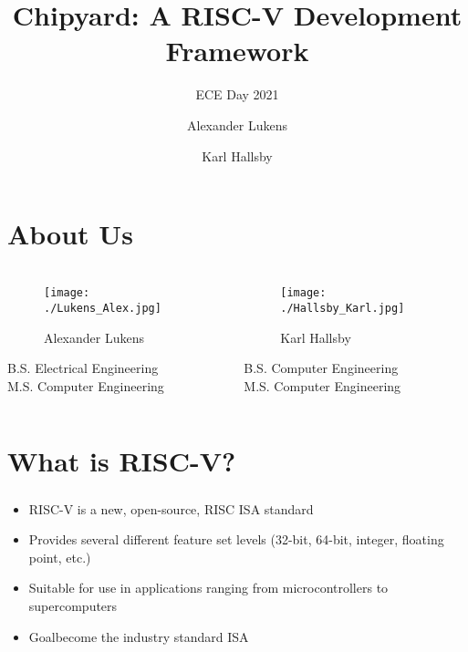 \documentclass{eceday}
\title[Chipyard]{Chipyard: A RISC-V Development Framework}
\subtitle{ECE Day 2021}
\author{Alexander Lukens \and Karl Hallsby}
\institute{Illinois Institute of Technology}
\date{\DTMdisplaydate{2021}{4}{9}{-1}}
\begin{document}
\nocite{chipyard}
\nocite{firesimChipyardOverview}

\begin{frame}
  \titlepage{}
\end{frame}

\section{About Us}\label{sec:About_Us}
\begin{frame}
  \frametitle{}
  
  \begin{columns}
    \begin{column}{0.50\linewidth}
      \begin{figure}[h!tbp]
        \centering
        \texttt{[image: ./Lukens\_Alex.jpg]}
        \caption*{Alexander Lukens}
        \label{fig:Alex_Lukens}
      \end{figure}
  		\begin{center}
          B.S. Electrical Engineering \\
          M.S. Computer Engineering
  		\end{center}
    \end{column}
    \begin{column}{0.50\linewidth}
      \begin{figure}[h!tbp]
        \centering
        \texttt{[image: ./Hallsby\_Karl.jpg]}
        \caption*{Karl Hallsby}
        \label{fig:Karl_Hallsby}
      \end{figure}
      \begin{center}
        B.S. Computer Engineering \\
        M.S. Computer Engineering
      \end{center}
    \end{column}
  \end{columns}
\end{frame}

\section{What is RISC-V?}\label{sec:What_is_RISC-V}
\begin{frame}
  \frametitle{}
  \begin{itemize}
  	\item RISC-V is a new, open-source, RISC ISA standard
  	\item Provides several different feature set levels (32-bit, 64-bit, integer, floating point, etc.)
  	\item Suitable for use in applications ranging from microcontrollers to supercomputers
  	\item Goal\textrightarrow become the industry standard ISA
  \end{itemize}
  
  \cite{FireSimTalk1}
%  
\end{frame}
\end{document}
